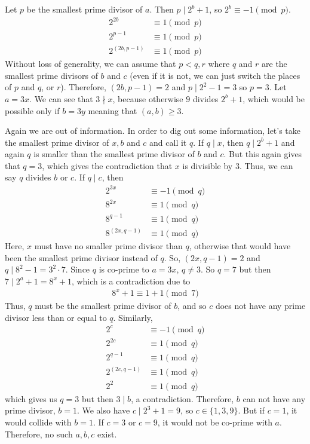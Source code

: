 \documentclass[problems.tex]{subfile}
\begin{document}
	\begin{solution}
		Let $p$ be the smallest prime divisor of $a$. Then $p\mid 2^b+1$, so $2^b\equiv-1\pmod p$.
			\begin{align*}
				2^{2b} & \equiv1\pmod p\\
				2^{p-1}& \equiv1\pmod p\\
				2^{(2b,p-1)}&\equiv1\pmod p
			\end{align*}
		Without loss of generality, we can assume that $p<q,r$ where $q$ and $r$  are the smallest prime divisors of $b$ and $c$ (even if it is not, we can just switch the places of $p$ and $q$, or $r$). Therefore, $(2b,p-1)=2$ and $p\mid 2^2-1=3$ so $p=3$. Let $a=3x$. We can see that $3\nmid x$, because otherwise $9$ divides $2^b+1$, which would be possible only if $b=3y$ meaning that $(a,b)\geq3$.

		Again we are out of information. In order to dig out some information, let's take the smallest prime divisor of $x,b$ and $c$ and call it $q$. If $q\mid x$, then $q\mid 2^b+1$ and again $q$ is smaller than the smallest prime divisor of $b$ and $c$. But this again gives that $q=3$, which gives the contradiction that $x$ is divisible by $3$. Thus, we can say $q$ divides $b$ or $c$. If $q\mid c$, then
			\begin{align*}
				2^{3x} & \equiv-1\pmod q\\
				8^{2x} & \equiv1\pmod q\\
				8^{q-1}& \equiv1\pmod q\\
				8^{(2x,q-1)}&\equiv1\pmod q
			\end{align*}
		Here, $x$ must have no smaller prime divisor than $q$, otherwise that would have been the smallest prime divisor instead of $q$. So, $(2x,q-1)=2$ and $q\mid 8^2-1=3^2\cdot7$. Since $q$ is co-prime to $a=3x$, $q\neq3$. So $q=7$ but then $7\mid 2^a+1=8^x+1$, which is a contradiction due to
			\begin{align*}
				8^x+1\equiv1+1\pmod7
			\end{align*}
		Thus, $q$ must be the smallest prime divisor of $b$, and so $c$ does not have any prime divisor less than or equal to $q$. Similarly,
			\begin{align*}
				2^c
					& \equiv-1\pmod q\\
				2^{2c}&\equiv1\pmod q\\
				2^{q-1}&\equiv1\pmod q\\
				2^{(2c,q-1)}&\equiv1\pmod q\\
				2^2&\equiv1\pmod q
			\end{align*}
		which gives us $q=3$ but then $3\mid b$, a contradiction. Therefore, $b$ can not have any prime divisor, $b=1$. We also have $c\mid 2^3+1=9$, so $c\in\{1,3,9\}$. But if $c=1$, it would collide with $b=1$. If $c=3$ or $c=9$, it would not be co-prime with $a$. Therefore, no such $a,b,c$ exist.
	\end{solution}
\end{document}
